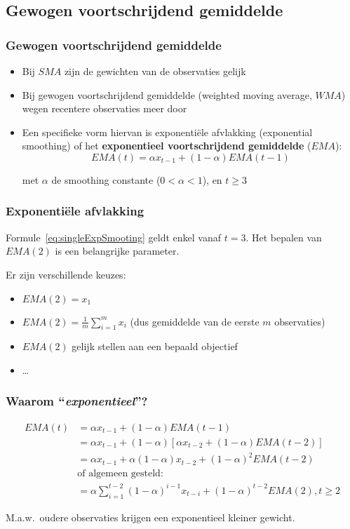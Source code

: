 \documentclass[aspectratio=169]{beamer}
\begin{document}
\subsection{Gewogen voortschrijdend gemiddelde}

\begin{frame}
  \frametitle{Gewogen voortschrijdend gemiddelde}
  
  \begin{itemize}
    \item Bij $SMA$ zijn de gewichten van de observaties gelijk
    \item Bij gewogen voortschrijdend gemiddelde (weighted moving average, $WMA$) wegen recentere observaties meer door
    \item Een specifieke vorm hiervan is exponentiële afvlakking (exponential smoothing) of het \textbf{exponentieel voortschrijdend gemiddelde} ($EMA$):
    \begin{equation}
    EMA(t) = \alpha x_{t-1} + (1-\alpha) EMA(t-1)
    \label{eq:singleExpSmooting}
    \end{equation}
    
    met $\alpha$ de smoothing constante ($0 < \alpha < 1$), en $t \geq 3$
  \end{itemize}
\end{frame}

\begin{frame}
  \frametitle{Exponentiële afvlakking}
  
  Formule~\ref{eq:singleExpSmooting} geldt enkel vanaf $t=3$. Het bepalen van $EMA(2)$ is een belangrijke parameter.
  
  Er zijn verschillende keuzes:
  
  \begin{itemize}
    \item $EMA(2) = x_1$
    \item $EMA(2) = \frac{1}{m} \sum_{i=1}^{m} x_i$ (dus gemiddelde van de eerste $m$ observaties)
    \item $EMA(2)$ gelijk stellen aan een bepaald objectief
    \item \ldots
  \end{itemize}
\end{frame}

\begin{frame}
  \frametitle{Waarom ``\textit{exponentieel}''?}
  
  \begin{align*}
  EMA(t) &= \alpha x_{t-1} + (1-\alpha) EMA(t-1)                                           \\
  &= \alpha x_{t-1} + (1-\alpha)\left[\alpha x_{t-2} + (1-\alpha)EMA(t - 2)\right]  \\
  &= \alpha x_{t-1} + \alpha (1-\alpha)x_{t-2} + (1-\alpha)^{2} EMA(t - 2)          \\
  &  \text{of algemeen gesteld:} \\
  &= \alpha \sum_{i=1}^{t-2}(1-\alpha)^{i-1}x_{t-i} + (1-\alpha)^{t-2} EMA(2), t \geq 2
  \end{align*}
  
  M.a.w.~oudere observaties krijgen een exponentieel kleiner gewicht.
\end{frame}
\end{document}
